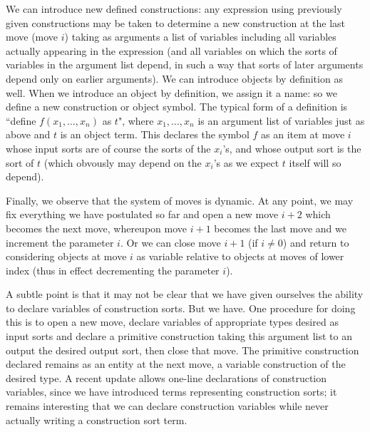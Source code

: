 \documentclass[12pt]{article}
\begin{document}
We can introduce new defined constructions:  any expression using previously given constructions may be taken to determine a new construction at the last move (move $i$) taking as arguments a list of variables including all variables actually appearing in the expression (and all variables on which the sorts of variables in the argument list depend, in such a way that sorts of later arguments depend only on earlier arguments).  We can introduce objects by definition as well.  When we introduce an object by definition, we assign it a name:  so we define a new construction or object symbol.  The typical form of a definition is ``define $f(x_1,\ldots,x_n)$ as $t$", where $x_1,\ldots,x_n$ is an argument list of variables just as above
and $t$ is an object term.  This declares the symbol $f$ as an item at move $i$ whose input sorts are of course the sorts of the $x_i$'s, and whose output sort is the sort of $t$
(which obvously may depend on the $x_i$'s as we expect $t$ itself will so depend).
  
Finally, we observe that the system of moves is dynamic.  At any point, we may fix everything we have postulated so far and open a new move $i+2$ which becomes the next move, whereupon move $i+1$ becomes the last move and we increment the parameter $i$.  Or we can close move $i+1$ (if $i \neq 0$) and return to considering objects
at move $i$ as variable relative to objects at moves of lower index (thus in effect decrementing the parameter $i$).

A subtle point is that it may not be clear that we have given ourselves the ability to declare variables of construction sorts.  But we have.  One procedure for doing this is
to open a new move, declare variables of appropriate types desired as input sorts and declare a primitive construction taking this argument list to an output the desired output  sort, then close that move.  The primitive construction declared remains as an entity at the next move, a variable construction of the desired type.    A recent update allows one-line declarations of construction variables, since we have introduced terms representing construction sorts;  it remains interesting that we can declare construction variables while never actually writing a construction sort term.
\end{document}
